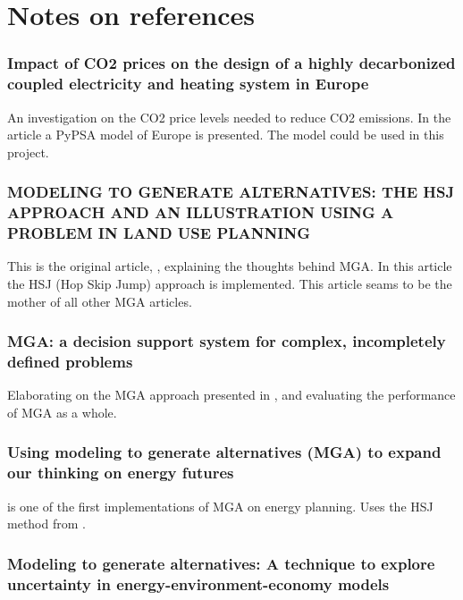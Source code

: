 

\section*{Notes on references}

\subsubsection*{Impact of CO2 prices on the design of a highly decarbonized coupled
electricity and heating system in Europe\cite{PypsaModel}}
An investigation on the CO2 price levels needed to reduce CO2 emissions. In the article a PyPSA model of Europe is presented. The model could be used in this project. 

\subsubsection*{MODELING TO GENERATE ALTERNATIVES: THE HSJ
APPROACH AND AN ILLUSTRATION USING A
PROBLEM IN LAND USE PLANNING \cite{Brill_MGA_1982}}

This is the original article, \cite{Brill_MGA_1982}, explaining the thoughts behind MGA. In this article the HSJ (Hop Skip Jump) approach is implemented. This article seams to be the mother of all other MGA articles. 

\subsubsection*{MGA: a decision support system for complex, incompletely defined problems\cite{Brill_MGA_1990}}
Elaborating on the MGA approach presented in \cite{Brill_MGA_1982}, and evaluating the performance of MGA as a whole. 

\subsubsection*{Using modeling to generate alternatives (MGA) to expand our thinking on
energy futures\cite{DeCarolis_MGA}}

\cite{DeCarolis_MGA} is one of the first implementations of MGA on energy planning. Uses the HSJ method from \cite{Brill_MGA_1982}.

\subsubsection*{Modeling to generate alternatives: A technique to explore uncertainty
in energy-environment-economy models \cite{MGA}}

